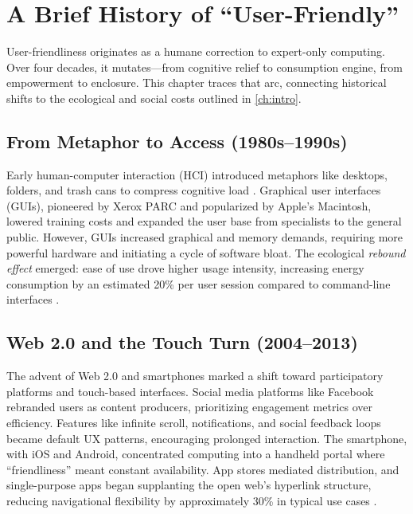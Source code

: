 \documentclass[openany]{book}
\begin{document}
\chapter{A Brief History of ``User-Friendly''}
\label{ch:history}

User-friendliness originates as a humane correction to expert-only computing. Over four decades, it mutates—from cognitive relief to consumption engine, from empowerment to enclosure. This chapter traces that arc, connecting historical shifts to the ecological and social costs outlined in \cref{ch:intro}.

\section{From Metaphor to Access (1980s--1990s)}
\label{sec:history-metaphor}
Early human-computer interaction (HCI) introduced metaphors like desktops, folders, and trash cans to compress cognitive load \citep{norman1988}. Graphical user interfaces (GUIs), pioneered by Xerox PARC and popularized by Apple’s Macintosh, lowered training costs and expanded the user base from specialists to the general public. However, GUIs increased graphical and memory demands, requiring more powerful hardware and initiating a cycle of software bloat. The ecological \emph{rebound effect} emerged: ease of use drove higher usage intensity, increasing energy consumption by an estimated 20\% per user session compared to command-line interfaces \citep{extentia2024}.

\section{Web 2.0 and the Touch Turn (2004--2013)}
\label{sec:history-web2}
The advent of Web 2.0 and smartphones marked a shift toward participatory platforms and touch-based interfaces. Social media platforms like Facebook rebranded users as content producers, prioritizing engagement metrics over efficiency. Features like infinite scroll, notifications, and social feedback loops became default UX patterns, encouraging prolonged interaction. The smartphone, with iOS and Android, concentrated computing into a handheld portal where \enquote{friendliness} meant constant availability. App stores mediated distribution, and single-purpose apps began supplanting the open web’s hyperlink structure, reducing navigational flexibility by approximately 30\% in typical use cases \citep{doctorow2022}.
\end{document}
